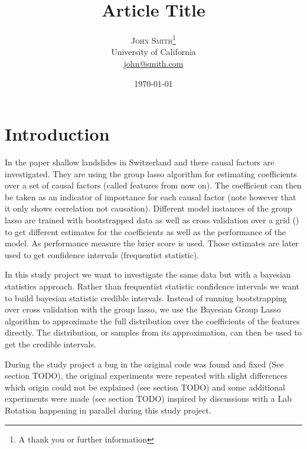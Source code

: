 \documentclass[twoside,twocolumn]{article}
\title{Article Title} %
\author{%
\textsc{John Smith}\thanks{A thank you or further information} \\[1ex] %
\normalsize University of California \\ %
\normalsize \href{mailto:john@smith.com}{john@smith.com} %
}
\date{\today} %
\begin{document}
\maketitle


\section{Introduction}

In the paper \cite[Investigating causal factors of shallow landslides in grassland regions of Switzerland]{zweifel_samarin_meusburger_alewell_2021} shallow landslides in Switzerland and there causal factors are investigated.
They are using the group lasso algorithm \cite{group_lasso} for estimating coefficients over a set of causal factors (called features from now on).
The coefficient can then be taken as an indicator of importance for each causal factor (note however that it only shows correlation not causation).
Different model instances of the group lasso are trained with bootstrapped data as well as cross validation over a grid (\cite[R package used]{blockCV}) to get different estimates for the coefficients as well as the performance of the model.
As performance measure the brier score is used.
Those estimates are later used to get confidence intervals (frequentist statistic).

In this study project we want to investigate the same data but with a bayesian statistics approach.
Rather than frequentist statistic confidence intervals we want to build bayesian statistic credible intervals.
Instead of running bootstrapping over cross validation with the group lasso, we use the Bayesian Group Lasso algorithm \cite{bayesian_group_lasso} to approximate the full distribution over the coefficients of the features directly.
The distribution, or samples from its approximation, can then be used to get the credible intervals.

During the study project a bug in the original code was found and fixed (See section TODO), the original experiments were repeated with slight differences which origin could not be explained (see section TODO)
and some additional experiments were made (see section TODO) inspired by discussions with a Lab Rotation happening in parallel during this study project.
\end{document}

